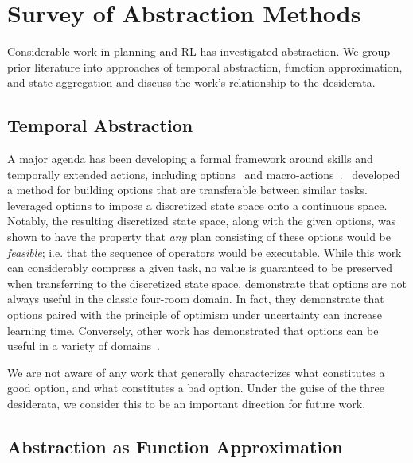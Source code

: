 \section{Survey of Abstraction Methods}

Considerable work in planning and \ac{RL} has investigated abstraction. We group prior literature into approaches of temporal abstraction, function approximation, and state aggregation and discuss the work's relationship to the desiderata.

\subsection{Temporal Abstraction}
A major agenda has been developing a formal framework around skills and temporally extended actions, including options~\cite{sutton1999between,barto2004intrinsically} and macro-actions~\cite{hauskrecht1998hierarchical}.~\cite{konidaris2007building} developed a method for building options that are transferable between similar tasks.~\cite{konidaris2014constructing} leveraged options to impose a discretized state space onto a continuous space. Notably, the resulting discretized state space, along with the given options, was shown to have the property that {\it any} plan consisting of these options would be {\it feasible}; i.e. that the sequence of operators would be executable. While this work can considerably compress a given task, no value is guaranteed to be preserved when transferring to the discretized state space. \cite{jong2008utility} demonstrate that options are not always useful in the classic four-room domain. In fact, they demonstrate that options paired with the principle of optimism under uncertainty can increase learning time. Conversely, other work has demonstrated that options can be useful in a variety of domains~\cite{sutton1999between,chentanez2004intrinsically}.

We are not aware of any work that generally characterizes what constitutes a good option, and what constitutes a bad option. Under the guise of the three desiderata, we consider this to be an important direction for future work.


\subsection{Abstraction as Function Approximation}

